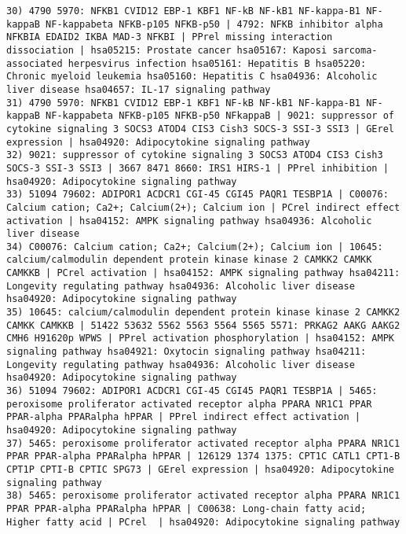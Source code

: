 \begin{lstlisting}[style=QuestionType]
30) 4790 5970: NFKB1 CVID12 EBP-1 KBF1 NF-kB NF-kB1 NF-kappa-B1 NF-kappaB NF-kappabeta NFKB-p105 NFKB-p50 | 4792: NFKB inhibitor alpha NFKBIA EDAID2 IKBA MAD-3 NFKBI | PPrel missing interaction dissociation | hsa05215: Prostate cancer hsa05167: Kaposi sarcoma-associated herpesvirus infection hsa05161: Hepatitis B hsa05220: Chronic myeloid leukemia hsa05160: Hepatitis C hsa04936: Alcoholic liver disease hsa04657: IL-17 signaling pathway
31) 4790 5970: NFKB1 CVID12 EBP-1 KBF1 NF-kB NF-kB1 NF-kappa-B1 NF-kappaB NF-kappabeta NFKB-p105 NFKB-p50 NFkappaB | 9021: suppressor of cytokine signaling 3 SOCS3 ATOD4 CIS3 Cish3 SOCS-3 SSI-3 SSI3 | GErel expression | hsa04920: Adipocytokine signaling pathway
32) 9021: suppressor of cytokine signaling 3 SOCS3 ATOD4 CIS3 Cish3 SOCS-3 SSI-3 SSI3 | 3667 8471 8660: IRS1 HIRS-1 | PPrel inhibition | hsa04920: Adipocytokine signaling pathway
33) 51094 79602: ADIPOR1 ACDCR1 CGI-45 CGI45 PAQR1 TESBP1A | C00076: Calcium cation; Ca2+; Calcium(2+); Calcium ion | PCrel indirect effect activation | hsa04152: AMPK signaling pathway hsa04936: Alcoholic liver disease
34) C00076: Calcium cation; Ca2+; Calcium(2+); Calcium ion | 10645: calcium/calmodulin dependent protein kinase kinase 2 CAMKK2 CAMKK CAMKKB | PCrel activation | hsa04152: AMPK signaling pathway hsa04211: Longevity regulating pathway hsa04936: Alcoholic liver disease hsa04920: Adipocytokine signaling pathway
35) 10645: calcium/calmodulin dependent protein kinase kinase 2 CAMKK2 CAMKK CAMKKB | 51422 53632 5562 5563 5564 5565 5571: PRKAG2 AAKG AAKG2 CMH6 H91620p WPWS | PPrel activation phosphorylation | hsa04152: AMPK signaling pathway hsa04921: Oxytocin signaling pathway hsa04211: Longevity regulating pathway hsa04936: Alcoholic liver disease hsa04920: Adipocytokine signaling pathway
36) 51094 79602: ADIPOR1 ACDCR1 CGI-45 CGI45 PAQR1 TESBP1A | 5465: peroxisome proliferator activated receptor alpha PPARA NR1C1 PPAR PPAR-alpha PPARalpha hPPAR | PPrel indirect effect activation | hsa04920: Adipocytokine signaling pathway
37) 5465: peroxisome proliferator activated receptor alpha PPARA NR1C1 PPAR PPAR-alpha PPARalpha hPPAR | 126129 1374 1375: CPT1C CATL1 CPT1-B CPT1P CPTI-B CPTIC SPG73 | GErel expression | hsa04920: Adipocytokine signaling pathway
38) 5465: peroxisome proliferator activated receptor alpha PPARA NR1C1 PPAR PPAR-alpha PPARalpha hPPAR | C00638: Long-chain fatty acid; Higher fatty acid | PCrel  | hsa04920: Adipocytokine signaling pathway
\end{lstlisting}
